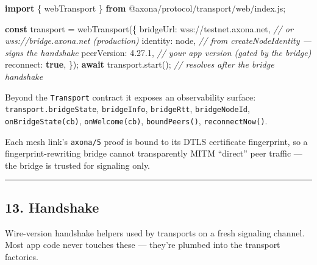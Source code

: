 \documentclass[
  nobib]{tufte-handout}
\newenvironment{Shaded}{}{}
\newcommand{\CommentTok}[1]{\textcolor[rgb]{0.38,0.63,0.69}{\textit{#1}}}
\newcommand{\ControlFlowTok}[1]{\textcolor[rgb]{0.00,0.44,0.13}{\textbf{#1}}}
\newcommand{\DataTypeTok}[1]{\textcolor[rgb]{0.56,0.13,0.00}{#1}}
\newcommand{\FunctionTok}[1]{\textcolor[rgb]{0.02,0.16,0.49}{#1}}
\newcommand{\ImportTok}[1]{\textcolor[rgb]{0.00,0.50,0.00}{\textbf{#1}}}
\newcommand{\KeywordTok}[1]{\textcolor[rgb]{0.00,0.44,0.13}{\textbf{#1}}}
\newcommand{\NormalTok}[1]{#1}
\newcommand{\OperatorTok}[1]{\textcolor[rgb]{0.40,0.40,0.40}{#1}}
\newcommand{\StringTok}[1]{\textcolor[rgb]{0.25,0.44,0.63}{#1}}
\begin{document}
\begin{Shaded}
\begin{Highlighting}[]
\ImportTok{import}\NormalTok{ \{ webTransport \} }\ImportTok{from} \StringTok{\textquotesingle{}@axona/protocol/transport/web/index.js\textquotesingle{}}\OperatorTok{;}

\KeywordTok{const}\NormalTok{ transport }\OperatorTok{=} \FunctionTok{webTransport}\NormalTok{(\{}
  \DataTypeTok{bridgeUrl}\OperatorTok{:}   \StringTok{\textquotesingle{}wss://testnet.axona.net\textquotesingle{}}\OperatorTok{,}  \CommentTok{// or wss://bridge.axona.net (production)}
  \DataTypeTok{identity}\OperatorTok{:}\NormalTok{    node}\OperatorTok{,}                       \CommentTok{// from createNodeIdentity — signs the handshake}
  \DataTypeTok{peerVersion}\OperatorTok{:} \StringTok{\textquotesingle{}4.27.1\textquotesingle{}}\OperatorTok{,}                   \CommentTok{// your app version (gated by the bridge)}
  \DataTypeTok{reconnect}\OperatorTok{:}   \KeywordTok{true}\OperatorTok{,}
\NormalTok{\})}\OperatorTok{;}
\ControlFlowTok{await}\NormalTok{ transport}\OperatorTok{.}\FunctionTok{start}\NormalTok{()}\OperatorTok{;}                  \CommentTok{// resolves after the bridge handshake}
\end{Highlighting}
\end{Shaded}

Beyond the \texttt{Transport} contract it exposes an observability
surface: \texttt{transport.bridgeState}, \texttt{bridgeInfo},
\texttt{bridgeRtt}, \texttt{bridgeNodeId}, \texttt{onBridgeState(cb)},
\texttt{onWelcome(cb)}, \texttt{boundPeers()}, \texttt{reconnectNow()}.

Each mesh link's \texttt{axona/5} proof is bound to its DTLS certificate
fingerprint, so a fingerprint-rewriting bridge cannot transparently MITM
``direct'' peer traffic --- the bridge is trusted for signaling only.

\begin{center}\rule{0.5\linewidth}{0.5pt}\end{center}

\subsection{13. Handshake}\label{handshake}

Wire-version handshake helpers used by transports on a fresh signaling
channel. Most app code never touches these --- they're plumbed into the
transport factories.
\end{document}
